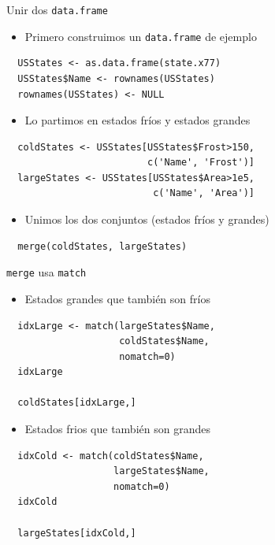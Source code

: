 \documentclass[xcolor={usenames,svgnames,dvipsnames}]{beamer}
\begin{document}
\begin{frame}[fragile,label=sec-4-2-7]{Unir dos \texttt{data.frame}}
 \begin{itemize}
\item Primero construimos un \texttt{data.frame} de ejemplo
\end{itemize}
\lstset{language=R,label= ,caption= ,numbers=none}
\begin{lstlisting}
  USStates <- as.data.frame(state.x77)
  USStates$Name <- rownames(USStates)
  rownames(USStates) <- NULL
\end{lstlisting}
\begin{itemize}
\item Lo partimos en estados \guillemotleft{}fríos\guillemotright{} y estados \guillemotleft{}grandes\guillemotright{}
\end{itemize}
\lstset{language=R,label= ,caption= ,numbers=none}
\begin{lstlisting}
  coldStates <- USStates[USStates$Frost>150,
                         c('Name', 'Frost')]
  largeStates <- USStates[USStates$Area>1e5,
                          c('Name', 'Area')]
\end{lstlisting}
\begin{itemize}
\item Unimos los dos conjuntos (estados \guillemotleft{}fríos\guillemotright{} y \guillemotleft{}grandes\guillemotright{})
\end{itemize}
\lstset{language=R,label= ,caption= ,numbers=none}
\begin{lstlisting}
  merge(coldStates, largeStates)
\end{lstlisting}
\end{frame}

\begin{frame}[fragile,label=sec-4-2-8]{\texttt{merge} usa \texttt{match}}
 \begin{itemize}
\item Estados grandes que también son fríos
\end{itemize}
\lstset{language=R,label= ,caption= ,numbers=none}
\begin{lstlisting}
  idxLarge <- match(largeStates$Name,
                    coldStates$Name,
                    nomatch=0)
  idxLarge
  
  coldStates[idxLarge,]
\end{lstlisting}

\begin{itemize}
\item Estados frios que también son grandes
\end{itemize}
\lstset{language=R,label= ,caption= ,numbers=none}
\begin{lstlisting}
  idxCold <- match(coldStates$Name,
                   largeStates$Name,
                   nomatch=0)
  idxCold
  
  largeStates[idxCold,]
\end{lstlisting}
\end{frame}
\end{document}

